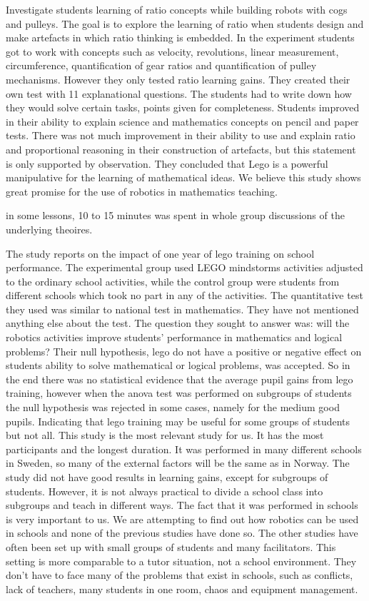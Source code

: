 \bigskip\noindent
\cite{norton2004using} Investigate students learning of ratio concepts while building robots with cogs and pulleys. The goal is to explore the learning of ratio when students design and make artefacts in which ratio thinking is embedded. In the experiment students got to work with concepts such as velocity, revolutions, linear measurement, circumference, quantification of gear ratios and quantification of pulley mechanisms. However they only tested ratio learning gains. They created their own test with 11 explanational questions. The students had to write down how they would solve certain tasks, points given for completeness. Students improved in their ability to explain science and mathematics concepts on pencil and paper tests. There was not much improvement in their ability to use and explain ratio and proportional reasoning in their construction of artefacts, but this statement is only supported by observation. They concluded that Lego is a powerful manipulative for the  learning of mathematical ideas. We believe this study shows great promise for the use of robotics in mathematics teaching.

\bigskip\noindent
\cite{norton2004using}in some lessons, 10 to 15 minutes was spent in whole group discussions of the underlying theoires. 

\bigskip\noindent
\cite{lindh2007does} The study reports on the impact of one year of lego training on school performance. The experimental group used LEGO mindstorms activities adjusted to the ordinary school activities, while the control group were students from different schools which took no part in any of the activities. The quantitative test they used was similar to national test in mathematics. They have not mentioned anything else about the test. The question they sought to answer was: will the robotics activities improve students’ performance in mathematics and logical problems? Their null hypothesis, lego do not have a positive or negative effect on students ability to solve mathematical or logical problems, was accepted. So in the end there was no statistical evidence that the average pupil gains from lego training, however when the anova test was performed on subgroups of students the null hypothesis was rejected in some cases, namely for the medium good pupils. Indicating that lego training may be useful for some groups of students but not all. This study is the most relevant study for us. It has the most participants and the longest duration. It was performed in many different schools in Sweden, so many of the external factors will be the same as in Norway. The study did not have good results in learning gains, except for subgroups of students. However, it is not always practical to divide a school class into subgroups and teach in different ways. The fact that it was performed in schools is very important to us. We are attempting to find out how robotics can be used in schools and none of the previous studies have done so. The other studies have often been set up with small groups of students and many facilitators. This setting is more comparable to a tutor situation, not a school environment. They don’t have to face many of the problems that exist in schools, such as conflicts, lack of teachers, many students in one room, chaos and equipment management. 

